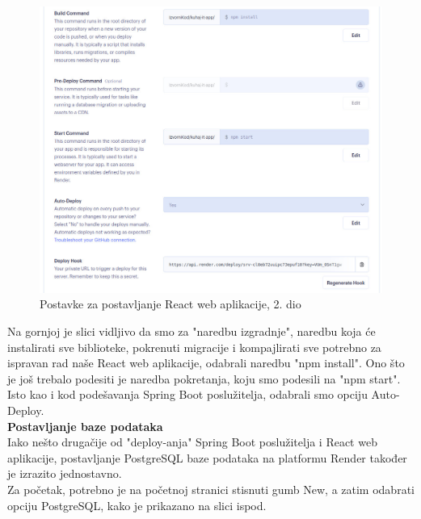 			\begin{figure}[H]
			\includegraphics[scale=0.4]{slike/Render_FRONTEND_2.JPG} %
			\centering
			\caption{Postavke za postavljanje React web aplikacije, 2. dio}
			\label{Postavke za postavljanje React web aplikacije, 2. dio}
		\end{figure}
		
		Na gornjoj je slici vidljivo da smo za "naredbu izgradnje", naredbu koja će instalirati sve biblioteke, pokrenuti migracije i kompajlirati sve potrebno za ispravan rad naše React web aplikacije, odabrali naredbu "npm install".
		Ono što je još trebalo podesiti je naredba pokretanja, koju smo podesili na "npm start".
		Isto kao i kod podešavanja Spring Boot poslužitelja, odabrali smo opciju Auto-Deploy. \\
		
				\textbf{Postavljanje baze podataka} \\
				Iako nešto drugačije od "deploy-anja" Spring Boot poslužitelja i React web aplikacije, postavljanje PostgreSQL baze podataka na platformu Render također je izrazito jednostavno. \\
				Za početak, potrebno je na početnoj stranici stisnuti gumb New, a zatim odabrati opciju PostgreSQL, kako je prikazano na slici ispod.
				
